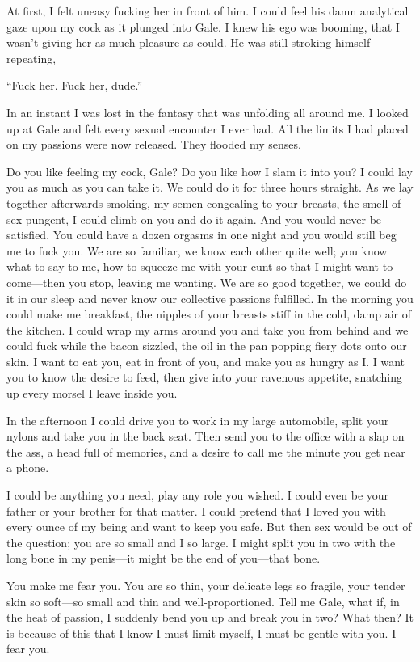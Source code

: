 At first, I felt uneasy fucking her in front of him. I could feel his
damn analytical gaze upon my cock as it plunged into Gale. I knew his
ego was booming, that I wasn't giving her as much pleasure as could. He
was still stroking himself repeating,

``Fuck her. Fuck her, dude.''

In an instant I was lost in the fantasy that was unfolding all around
me. I looked up at Gale and felt every sexual encounter I ever had. All
the limits I had placed on my passions were now released. They flooded
my senses.

Do you like feeling my cock, Gale? Do you like how I slam it into you? I
could lay you as much as you can take it. We could do it for three hours
straight. As we lay together afterwards smoking, my semen congealing to
your breasts, the smell of sex pungent, I could climb on you and do it
again. And you would never be satisfied. You could have a dozen orgasms
in one night and you would still beg me to fuck you. We are so familiar,
we know each other quite well; you know what to say to me, how to
squeeze me with your cunt so that I might want to come---then you stop,
leaving me wanting. We are so good together, we could do it in our sleep
and never know our collective passions fulfilled. In the morning you
could make me breakfast, the nipples of your breasts stiff in the cold,
damp air of the kitchen. I could wrap my arms around you and take you
from behind and we could fuck while the bacon sizzled, the oil in the
pan popping fiery dots onto our skin. I want to eat you, eat in front of
you, and make you as hungry as I. I want you to know the desire to feed,
then give into your ravenous appetite, snatching up every morsel I leave
inside you.

In the afternoon I could drive you to work in my large automobile, split
your nylons and take you in the back seat. Then send you to the office
with a slap on the ass, a head full of memories, and a desire to call me
the minute you get near a phone.

I could be anything you need, play any role you wished. I could even be
your father or your brother for that matter. I could pretend that I
loved you with every ounce of my being and want to keep you safe. But
then sex would be out of the question; you are so small and I so large.
I might split you in two with the long bone in my penis---it might be
the end of you---that bone.

You make me fear you. You are so thin, your delicate legs so fragile,
your tender skin so soft---so small and thin and well-proportioned. Tell
me Gale, what if, in the heat of passion, I suddenly bend you up and
break you in two? What then? It is because of this that I know I must
limit myself, I must be gentle with you. I fear you.

